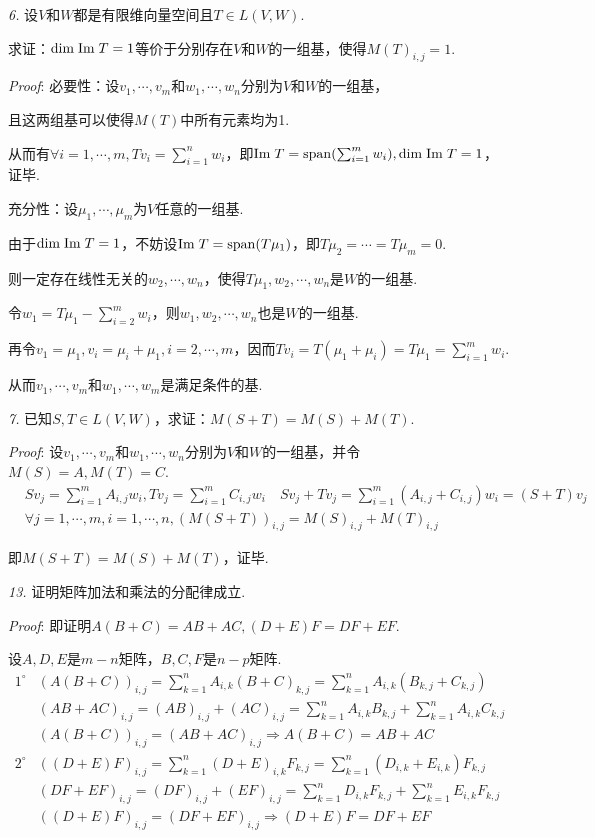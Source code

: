 \textit{6.}
设\(V\)和\(W\)都是有限维向量空间且\(T \in L(V,W)\).

求证：\(\mathrm{dim \;} \mathrm{Im \;} T=1\)等价于分别存在\(V\)和\(W\)的一组基，使得\(M(T)_{i,j}=1\).

\textit{Proof}:
必要性：设\(v_1,\cdots,v_m\)和\(w_1,\cdots,w_n\)分别为\(V\)和\(W\)的一组基，

且这两组基可以使得\(M(T)\)中所有元素均为1.

从而有\(\forall i=1,\cdots,m,Tv_i=\sum_{i=1}^n w_i\)，即\(\mathrm{Im \;} T=\mathrm{span} (\sum_{i=1}^m w_i),\mathrm{dim \;} \mathrm{Im \;} T=1\)，证毕.

充分性：设\(\mu_1,\cdots,\mu_m\)为\(V\)任意的一组基.

由于\(\mathrm{dim \;} \mathrm{Im \;} T=1\)，不妨设\(\mathrm{Im \;} T=\mathrm{span} (T \mu_1)\)，即\(T \mu_2=\cdots=T \mu_m=0\).

则一定存在线性无关的\(w_2,\cdots,w_n\)，使得\(T \mu_1,w_2,\cdots,w_n\)是\(W\)的一组基.

令\(w_1=T \mu_1-\sum_{i=2}^m w_i\)，则\(w_1,w_2,\cdots,w_n\)也是\(W\)的一组基.

再令\(v_1=\mu_1,v_i=\mu_i+\mu_1,i=2,\cdots,m\)，因而\(Tv_i=T(\mu_1+\mu_i)=T \mu_1=\sum_{i=1}^m w_i\).

从而\(v_1,\cdots,v_m\)和\(w_1,\cdots,w_m\)是满足条件的基.

\hspace*{\fill}

\textit{7.}
已知\(S,T \in L(V,W)\)，求证：\(M(S+T)=M(S)+M(T)\).

\textit{Proof}:
设\(v_1,\cdots,v_m\)和\(w_1,\cdots,w_n\)分别为\(V\)和\(W\)的一组基，并令\(M(S)=A,M(T)=C\).
    \begin{align*}
        &Sv_j=\sum_{i=1}^m A_{i,j}w_i,Tv_j=\sum_{i=1}^m C_{i,j}w_i \quad
        Sv_j+Tv_j=\sum_{i=1}^m (A_{i,j}+C_{i,j})w_i=(S+T)v_j \\
        &\forall j=1,\cdots,m,i=1,\cdots,n,(M(S+T))_{i,j}=M(S)_{i,j}+M(T)_{i,j}
    \end{align*}

即\(M(S+T)=M(S)+M(T)\)，证毕.

\newpage

\textit{13.}
证明矩阵加法和乘法的分配律成立.

\textit{Proof}:
即证明\(A(B+C)=AB+AC,(D+E)F=DF+EF\).

设\(A,D,E\)是\(m-n\)矩阵，\(B,C,F\)是\(n-p\)矩阵.
    \begin{align*}
        1^{\circ} &(A(B+C))_{i,j}=\sum_{k=1}^n A_{i,k}(B+C)_{k,j}=\sum_{k=1}^n A_{i,k}(B_{k,j}+C_{k,j}) \\
        &(AB+AC)_{i,j}=(AB)_{i,j}+(AC)_{i,j}=\sum_{k=1}^n A_{i,k}B_{k,j}+\sum_{k=1}^n A_{i,k}C_{k,j} \\
        &(A(B+C))_{i,j}=(AB+AC)_{i,j} \Rightarrow A(B+C)=AB+AC \\
        2^{\circ} &((D+E)F)_{i,j}=\sum_{k=1}^n (D+E)_{i,k}F_{k,j}=\sum_{k=1}^n (D_{i,k}+E_{i,k})F_{k,j} \\
        &(DF+EF)_{i,j}=(DF)_{i,j}+(EF)_{i,j}=\sum_{k=1}^n D_{i,k}F_{k,j}+\sum_{k=1}^n E_{i,k}F_{k,j} \\
        &((D+E)F)_{i,j}=(DF+EF)_{i,j} \Rightarrow (D+E)F=DF+EF
    \end{align*}

